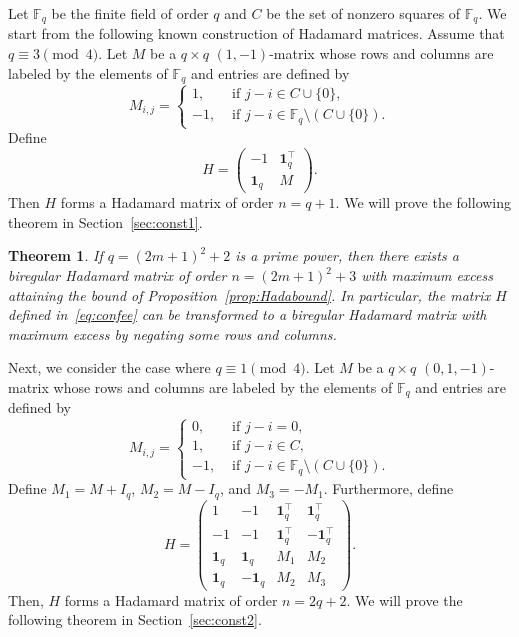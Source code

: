\documentclass[10pt]{amsart}
\newtheorem{theo}{Theorem}[section]
\theoremstyle{definition}
\newcommand*\F{{\mathbb F}}
\newcommand*\tra{\top}
\newcommand*{\un}{\mathbf{1}}
\begin{document}
Let $\F_q$ be the finite field of order $q$ and $C$ be the set of nonzero squares of $\F_{q}$. We start from the following known construction of Hadamard matrices. Assume that $q\equiv 3\pmod{4}$. Let $M$ be a $q\times q$ $(1,-1)$-matrix whose rows and columns are labeled by the elements of $\F_q$ and entries are defined by
\[
M_{i,j}=
\begin{cases}
1,& \text{ if } j-i\in C \cup \{0\},\\
-1,& \text{ if } j-i\in \F_q\setminus (C \cup \{0\}).
\end{cases}
\]
Define
\begin{equation}\label{eq:confee}
H=
\begin{pmatrix} -1 & \un_q^\tra \\ \un_q & M
\end{pmatrix}.
\end{equation}
Then $H$ forms a Hadamard matrix of order $n=q+1$. We will prove the following theorem in Section~\ref{sec:const1}.

\begin{theo}\label{thm:main1}
If $q=(2m+1)^2+2$ is a prime power, then there exists a biregular Hadamard matrix of order $n=(2m+1)^2+3$ with maximum excess attaining the bound of Proposition~\ref{prop:Hadabound}. In particular, the matrix $H$ defined in~\eqref{eq:confee} can be transformed to a biregular Hadamard matrix with maximum excess by negating some rows and columns.
\end{theo}

Next, we consider the case where $q\equiv 1\pmod{4}$. Let $M$ be a $q\times q$ $(0,1,-1)$-matrix whose rows and columns are labeled by the elements of $\F_q$ and entries are defined by
\[
M_{i,j}=
\begin{cases}
0,& \text{ if } j-i=0,\\
1,& \text{ if } j-i\in C,\\
-1,& \text{ if } j-i\in \F_q \setminus (C \cup \{0\}).
\end{cases}
\]
Define $M_1=M+I_q$, $M_2=M-I_q$, and $M_3=-M_1$. Furthermore, define
\begin{equation}\label{eq:hada2ee}
H=
\begin{pmatrix}
1 &-1 & \un_q^\tra& \un_q^\tra \\
-1 & -1 & \un_q^\tra&-\un_q^\tra \\
\un_q & \un_q &M_1 & M_2 \\
\un_q & -\un_q&M_2 & M_3
\end{pmatrix}.
\end{equation}
Then, $H$ forms a Hadamard matrix of order $n=2q+2$. We will prove the following theorem in Section~\ref{sec:const2}.
\end{document}
